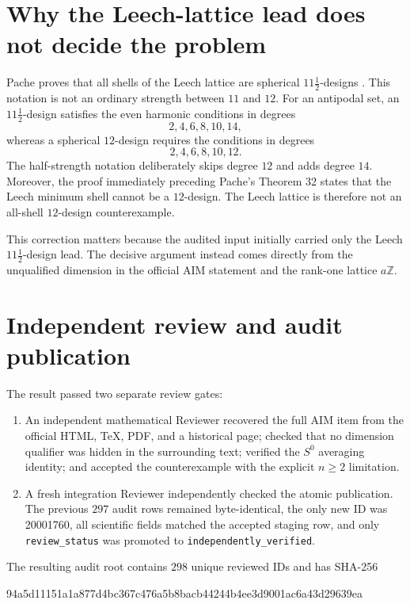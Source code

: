 \documentclass[11pt]{article}
\newcommand{\artifact}[1]{\texttt{\small #1}}
\theoremstyle{argusplain}
\begin{document}
\section{Why the Leech-lattice lead does not decide the problem}

Pache proves that all shells of the Leech lattice are spherical $11\tfrac12$-designs \cite{Pache2005}. This notation is not an ordinary strength between $11$ and $12$. For an antipodal set, an $11\tfrac12$-design satisfies the even harmonic conditions in degrees
\[
  2,4,6,8,10,14,
\]
whereas a spherical $12$-design requires the conditions in degrees
\[
  2,4,6,8,10,12.
\]
The half-strength notation deliberately skips degree $12$ and adds degree $14$. Moreover, the proof immediately preceding Pache's Theorem 32 states that the Leech minimum shell cannot be a $12$-design. The Leech lattice is therefore not an all-shell $12$-design counterexample.

This correction matters because the audited input initially carried only the Leech $11\tfrac12$-design lead. The decisive argument instead comes directly from the unqualified dimension in the official AIM statement and the rank-one lattice $a\mathbb Z$.

\section{Independent review and audit publication}

The result passed two separate review gates:

\begin{enumerate}
  \item An independent mathematical Reviewer recovered the full AIM item from the official HTML, TeX, PDF, and a historical page; checked that no dimension qualifier was hidden in the surrounding text; verified the $S^0$ averaging identity; and accepted the counterexample with the explicit $n\geq2$ limitation.
  \item A fresh integration Reviewer independently checked the atomic publication. The previous $297$ audit rows remained byte-identical, the only new ID was 20001760, all scientific fields matched the accepted staging row, and only \artifact{review\_status} was promoted to \artifact{independently\_verified}.
\end{enumerate}

The resulting audit root contains $298$ unique reviewed IDs and has SHA-256
\begin{resultbox}
\centering\ttfamily\small
94a5d11151a1a877d4bc367c476a5b8bacb44244b4ee3d9001ac6a43d29639ea
\end{resultbox}
\end{document}
